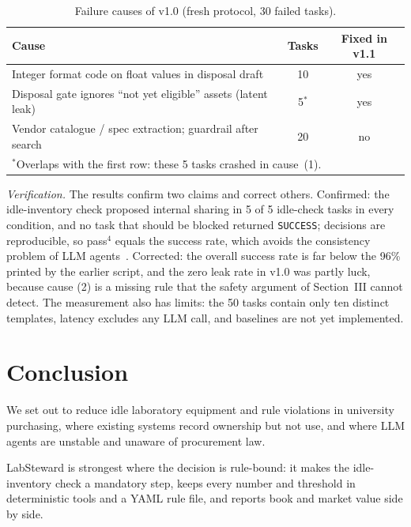 \documentclass[conference]{IEEEtran}
\begin{document}
\begin{table}[t]
\centering
\caption{Failure causes of v1.0 (fresh protocol, 30 failed tasks).}
\label{tab:fail}
\footnotesize
\begin{tabular}{p{4.6cm}cc}
\toprule
Cause & Tasks & Fixed in v1.1 \\
\midrule
Integer format code on float values in disposal draft & 10 & yes \\
Disposal gate ignores ``not yet eligible'' assets (latent leak) & 5$^{*}$ & yes \\
Vendor catalogue / spec extraction; guardrail after search & 20 & no \\
\bottomrule
\multicolumn{3}{l}{\scriptsize $^{*}$Overlaps with the first row: these 5 tasks crashed in cause~(1).}
\end{tabular}
\end{table}

\textit{Verification.} The results confirm two claims and correct
others. Confirmed: the idle-inventory check proposed internal sharing in
5 of 5 idle-check tasks in every condition, and no task that should be
blocked returned \texttt{SUCCESS}; decisions are reproducible, so
pass$^4$ equals the success rate, which avoids the consistency problem of
LLM agents~\cite{yao2024taubench}. Corrected: the overall success rate is
far below the 96\% printed by the earlier script, and the zero leak rate
in v1.0 was partly luck, because cause (2) is a missing rule that the
safety argument of Section~III cannot detect. The measurement also has
limits: the 50 tasks contain only ten distinct templates, latency excludes
any LLM call, and baselines are not yet implemented.

\section{Conclusion}
We set out to reduce idle laboratory equipment and rule violations in
university purchasing, where existing systems record ownership but not
use, and where LLM agents are unstable and unaware of procurement law.

LabSteward is strongest where the decision is rule-bound: it makes the
idle-inventory check a mandatory step, keeps every number and threshold
in deterministic tools and a YAML rule file, and reports book and market
value side by side.
\end{document}
